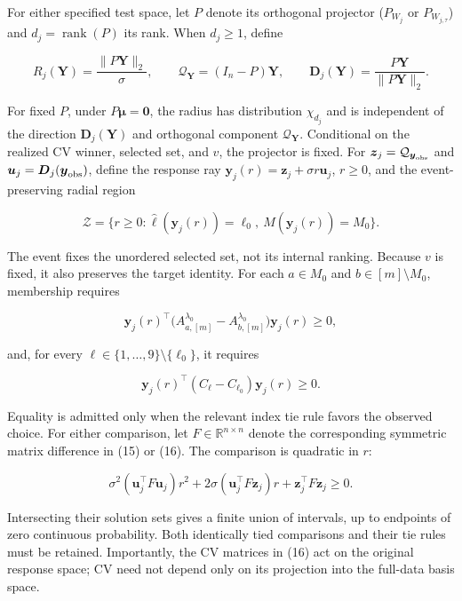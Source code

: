 \documentclass[
  11pt,
]{article}
\begin{document}
For either specified test space, let \(P\) denote its orthogonal
projector (\(P_{W_j}\) or \(P_{W_{j,\tau}}\)) and
\(d_j=\operatorname{rank}(P)\) its rank. When \(d_j\ge1\), define

\[
R_j(\boldsymbol Y)=\frac{\|P\boldsymbol Y\|_2}{\sigma},\qquad
\mathcal Q_{\boldsymbol Y}=(I_n-P)\boldsymbol Y,\qquad
\boldsymbol D_j(\boldsymbol Y)=\frac{P\boldsymbol Y}{\|P\boldsymbol Y\|_2}.
\tag{13}
\]

For fixed \(P\), under \(P\boldsymbol\mu=\boldsymbol0\), the radius has
distribution \(\chi_{d_j}\) and is independent of the direction
\(\boldsymbol D_j(\boldsymbol Y)\) and orthogonal component
\(\mathcal Q_{\boldsymbol Y}\). Conditional on the realized CV winner,
selected set, and \(v\), the projector is fixed. For
\(\boldsymbol z_j=\mathcal Q_{\boldsymbol y_{\rm obs}}\) and
\(\boldsymbol u_j=\boldsymbol D_j(\boldsymbol y_{\rm obs})\), define the
response ray
\(\boldsymbol y_j(r)=\boldsymbol z_j+\sigma r\boldsymbol u_j\),
\(r\ge0\), and the event-preserving radial region

\[
\mathcal Z=
\{r\ge0:\widehat\ell(\boldsymbol y_j(r))=\ell_0,\ M(\boldsymbol y_j(r))=M_0\}.
\tag{14}
\]

The event fixes the unordered selected set, not its internal ranking.
Because \(v\) is fixed, it also preserves the target identity. For each
\(a\in M_0\) and \(b\in[m]\setminus M_0\), membership requires

\[
\boldsymbol y_j(r)^\top\bigl(A_{a,[m]}^{\lambda_0}-A_{b,[m]}^{\lambda_0}\bigr)\boldsymbol y_j(r)\ge0,
\tag{15}
\]

and, for every \(\ell\in\{1,\ldots,9\}\setminus\{\ell_0\}\), it requires

\[
\boldsymbol y_j(r)^\top(C_\ell-C_{\ell_0})\boldsymbol y_j(r)\ge0.
\tag{16}
\]


Equality is admitted only when the relevant index tie rule favors the
observed choice. For either comparison, let
\(F\in\mathbb R^{n\times n}\) denote the corresponding symmetric matrix
difference in (15) or (16). The comparison is quadratic in \(r\):

\[
\sigma^2(\boldsymbol u_j^\top F\boldsymbol u_j)r^2+2\sigma(\boldsymbol u_j^\top F\boldsymbol z_j)r+\boldsymbol z_j^\top F\boldsymbol z_j\ge0.
\tag{17}
\]

Intersecting their solution sets gives a finite union of intervals, up
to endpoints of zero continuous probability. Both identically tied
comparisons and their tie rules must be retained. Importantly, the CV
matrices in (16) act on the original response space; CV need not depend
only on its projection into the full-data basis space.
\end{document}
